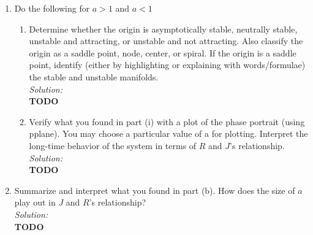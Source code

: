 \documentclass[10pt]{amsart}
\theoremstyle{nonumberplain}
\begin{document}
\begin{enumerate}[label={\bf {\arabic*}:}]
\begin{enumerate}
\item Do the following for $a > 1$ and $ a < 1$ \\

\begin{enumerate}

\item Determine whether the origin is asymptotically stable, neutrally stable, unstable and attracting, or unstable and not attracting.
Also classify the origin as a saddle point, node, center, or spiral.
If the origin is a saddle point, identify (either by highlighting or explaining with words/formulae) the stable and unstable manifolds. \\
\textit{Solution:} \\
\textbf{TODO} \\

\item Verify what you found in part (i) with a plot of the phase portrait (using pplane).
You may choose a particular value of a for plotting.
Interpret the long-time behavior of the system in terms of $R$ and $J$’s relationship. \\
\textit{Solution:} \\
\textbf{TODO} \\

\end{enumerate}

\item Summarize and interpret what you found in part (b).
How does the size of $a$ play out in $J$ and $R$’s relationship? \\
\textit{Solution:} \\
\textbf{TODO} \\

\end{enumerate}

\end{enumerate}
\end{document}
